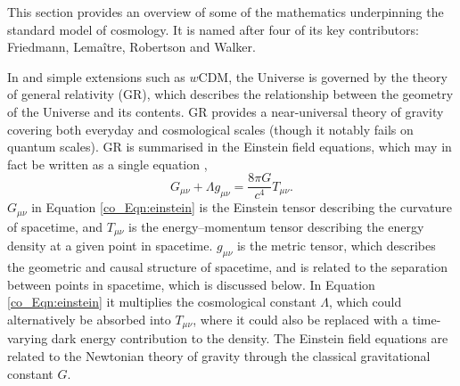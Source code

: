 This section provides an overview of some of the mathematics underpinning the standard model of cosmology. It is named after four of its key contributors: Friedmann, Lema\^itre, Robertson and Walker.

In \lcdm{} and simple extensions such as $w$CDM, the Universe is governed by the theory of general relativity (GR), which describes the relationship between the geometry of the Universe and its contents. GR provides a near-universal theory of gravity covering both everyday and cosmological scales (though it notably fails on quantum scales). GR is summarised in the Einstein field equations, which may in fact be written as a single equation \citep{Einstein1916},
\begin{equation}
G_{\mu \nu} + \Lambda g_{\mu \nu}
= \frac{8 \pi G}{c^4} T_{\mu \nu}.
\label{co_Eqn:einstein}
\end{equation}
$G_{\mu \nu}$ in Equation \eqref{co_Eqn:einstein} is the Einstein tensor describing the curvature of spacetime, and $T_{\mu \nu}$ is the energy--momentum tensor describing the energy density at a given point in spacetime. $g_{\mu \nu}$ is the metric tensor, which describes the geometric and causal structure of spacetime, and is related to the separation between points in spacetime, which is discussed below. In Equation \eqref{co_Eqn:einstein} it multiplies the cosmological constant $\Lambda$, which could alternatively be absorbed into $T_{\mu \nu}$, where it could also be replaced with a time-varying dark energy contribution to the density. The Einstein field equations are related to the Newtonian theory of gravity through the classical gravitational constant $G$.

